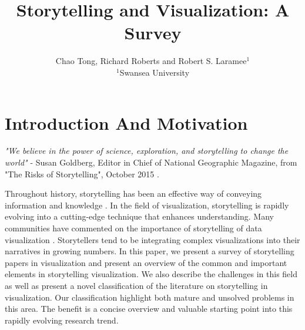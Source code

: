 \documentclass{egpubl}
\begin{document}
\title[Storytelling and Visualization: A Survey]%
      {Storytelling and Visualization: A Survey}

\author[C.Tong \& R.Roberts \& R.S.Laramee]
       {Chao Tong, Richard Roberts
        and Robert S. Laramee$^{1}$
        \\
        $^1$Swansea University
       }

\maketitle
\tableofcontents
\section{Introduction And Motivation}
\textit{"We believe in the power of science, exploration, and storytelling to change the world"} - Susan Goldberg, Editor in Chief of National Geographic Magazine, from "The Risks of Storytelling", October 2015 \cite{risks2015}. 

Throughout history, storytelling has been an effective way of conveying information and knowledge \cite{Lidal2013}. In the field of visualization, storytelling is rapidly evolving into a cutting-edge technique that enhances understanding. Many communities have commented on the importance of storytelling of data visualization \cite{segal}. Storytellers tend to be integrating complex visualizations into their narratives in growing numbers. In this paper, we present a survey of storytelling papers in visualization and present an overview of the common and important elements in storytelling visualization. We also describe the challenges in this field as well as present a novel classification of the literature on storytelling in visualization. Our classification highlight both mature and unsolved problems in this area. The benefit is a concise overview and valuable starting point into this rapidly evolving research trend. 
\end{document}
